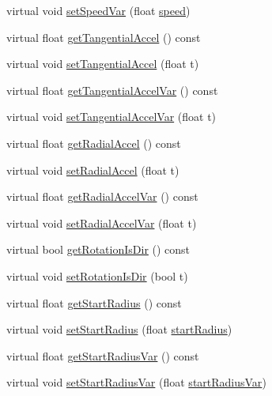 \begin{DoxyCompactItemize}
\item 
virtual void \hyperlink{classParticleSystem_a955801e34086ad0d52af388ba9fd9f42}{set\+Speed\+Var} (float \hyperlink{classParticleSystem_a1a4bba0d174d86e0a941b71c1d485b50}{speed})
\item 
virtual float \hyperlink{classParticleSystem_ae0ba129e971088a2d661b311f541fd10}{get\+Tangential\+Accel} () const
\item 
virtual void \hyperlink{classParticleSystem_a7dbd2f0d4e98bbbd1cc6afe3ea8d6acb}{set\+Tangential\+Accel} (float t)
\item 
virtual float \hyperlink{classParticleSystem_acde1d993d42f6436509b8187e5dd6330}{get\+Tangential\+Accel\+Var} () const
\item 
virtual void \hyperlink{classParticleSystem_a35cce5656283f041c56add4ac4613855}{set\+Tangential\+Accel\+Var} (float t)
\item 
virtual float \hyperlink{classParticleSystem_af1f7c2c3ea55156b38fc51436a9dd419}{get\+Radial\+Accel} () const
\item 
virtual void \hyperlink{classParticleSystem_a9945680801a2d3a81315c5953ed1510f}{set\+Radial\+Accel} (float t)
\item 
virtual float \hyperlink{classParticleSystem_acbdbf0d79ca1bd80fa55a69dcadbfa02}{get\+Radial\+Accel\+Var} () const
\item 
virtual void \hyperlink{classParticleSystem_a54a5c8d241e2391202d236085fb125c8}{set\+Radial\+Accel\+Var} (float t)
\item 
virtual bool \hyperlink{classParticleSystem_aae89ceed355b56151c046ac4b4091c1e}{get\+Rotation\+Is\+Dir} () const
\item 
virtual void \hyperlink{classParticleSystem_a696b9310f5d29df6d75d954baed79b93}{set\+Rotation\+Is\+Dir} (bool t)
\item 
virtual float \hyperlink{classParticleSystem_a1cf66d31863be535a8006eb7c5995e97}{get\+Start\+Radius} () const
\item 
virtual void \hyperlink{classParticleSystem_a1a46e9c7b5df5892ba149e1e13ff177f}{set\+Start\+Radius} (float \hyperlink{classParticleSystem_ad3033aadd088e0d11192096f5ad66384}{start\+Radius})
\item 
virtual float \hyperlink{classParticleSystem_a669c3cac9c3179cd8e2a5cbaf7f0d628}{get\+Start\+Radius\+Var} () const
\item 
virtual void \hyperlink{classParticleSystem_accdf68ba0c7c75b3e94d14f8c11de163}{set\+Start\+Radius\+Var} (float \hyperlink{classParticleSystem_a6144edbe628515ebe32c57c2c67e35cc}{start\+Radius\+Var})

\end{DoxyCompactItemize}
